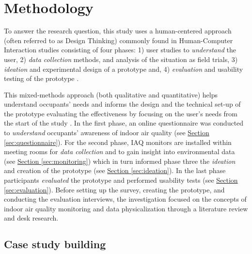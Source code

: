 \section{Methodology}
\label{sec:methodology}

To answer the research question, this study uses a human-centered approach (often referred to as Design Thinking) commonly found in Human-Computer Interaction studies consisting of four phases: 1) user studies to \textit{understand} the user, 2) \textit{data collection} methods, and analysis of the situation as field trials, 3) \textit{ideation} and experimental design of a prototype and, 4) \textit{evaluation} and usability testing of the prototype \cite{jonathan_lazar_research_2017, zimmerman_research_2007}.

This mixed-methods approach (both qualitative and quantitative) helps understand occupants' needs and informs the design and the technical set-up of the prototype evaluating the effectiveness by focusing on the user's needs from the start of the study \cite{rogers_moving_2017, experience_ux_2024}. 
In the first phase, an online questionnaire was conducted to \textit{understand} occupants' awareness of indoor air quality (see \hyperref[sec:questionnaire]{Section \ref*{sec:questionnaire}}). For the second phase, IAQ monitors are installed within meeting rooms for \textit{data collection} and to gain insight into environmental data (see \hyperref[sec:monitoring]{Section \ref*{sec:monitoring}}) which in turn informed phase three the \textit{ideation} and creation of the prototype (see \hyperref[sec:ideation]{Section \ref*{sec:ideation}}). In the last phase participants \textit{evaluated} the prototype and performed usability tests (see \hyperref[sec:evaluation]{Section \ref*{sec:evaluation}}). Before setting up the survey, creating the prototype, and conducting the evaluation interviews, the investigation focused on the concepts of indoor air quality monitoring and data physicalization through a literature review and desk research.

\subsection{Case study building}

